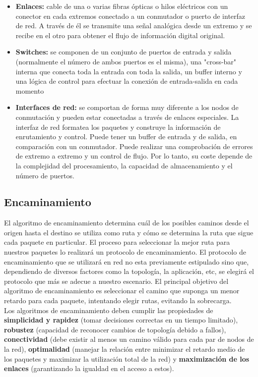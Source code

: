 \begin{itemize}
	\item \textbf{Enlaces: } cable de una o varias fibras ópticas o hilos eléctricos con un conector en cada extremos conectado a un conmutador o puerto de interfaz de red. A través de él se transmite una señal analógica desde un extremo y se recibe en el otro para obtener el flujo de información digital original.
	\item \textbf{Switches: } se componen de un conjunto de puertos de entrada y salida (normalmente el número de ambos puertos es el misma), una "cross-bar" interna que conecta toda la entrada con toda la salida, un buffer interno y una lógica de control para efectuar la conexión de entrada-salida en cada momento
	\item \textbf{Interfaces de red:} se comportan de forma muy diferente a los nodos de conmutación y pueden estar conectadas a través de enlaces especiales. La interfaz de red formatea los paquetes y construye la información de enrutamiento y control. Puede tener un buffer de entrada y de salida, en comparación con un conmutador. Puede realizar una comprobación de errores de extremo a extremo y un control de flujo. Por lo tanto, su coste depende de la complejidad del procesamiento, la capacidad de almacenamiento y el número de puertos.
\end{itemize}

\subsection{Encaminamiento}
El algoritmo de encaminamiento determina cuál de los posibles caminos desde el origen hasta el destino se utiliza como ruta y cómo se determina la ruta que sigue cada paquete en particular. El proceso para seleccionar la mejor ruta para nuestros paquetes lo realizará un protocolo de encaminamiento. El protocolo de encaminamiento que se utilizará en red no esta previamente estipulado sino que, dependiendo de diversos factores como la topología, la aplicación, etc, se elegirá el protocolo que más se adecue a nuestro escenario. El principal objetivo del algoritmo de encaminamiento es seleccionar el camino que suponga un menor retardo para cada paquete, intentando elegir rutas, evitando la sobrecarga.\\

Los algoritmos de encaminamiento deben cumplir las propiedades de \textbf{simplicidad y rapidez} (tomar decisiones correctas en un tiempo limitado), \textbf{robustez} (capacidad de reconocer cambios de topología debido a fallos), \textbf{conectividad} (debe existir al menos un camino válido para cada par de nodos de la red), \textbf{optimalidad} (manejar la relación entre minimizar el retardo medio de los paquetes y maximizar la utilización total de la red) y \textbf{maximización de los enlaces} (garantizando la igualdad en el acceso a estos).\\

